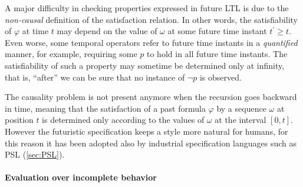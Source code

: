 A major difficulty in checking properties expressed in future LTL is due to the \textit{non-causal} definition of the satisfaction relation. In other words, the satisfiability of $\varphi$ at time $t$ may depend on the value of $\omega$ at some future time instant $t^\prime \geq t$. Even worse, some temporal operators refer to future time instants in a \textit{quantified} manner, for example, requiring some $p$ to hold in all future time instants. The satisfiability of such a property may sometime be determined only at infinity, that is, “after” we can be sure
that no instance of $\neg p$ is observed.
\par The causality problem is not present anymore when the recursion goes backward in time, meaning that the satisfaction of a past formula $\varphi$ by a sequence $\omega$ at position $t$ is determined only according to the values of $\omega$ at the interval $[0, t]$. However the futuristic specification keeps a style more natural for humans, for this reason it has been adopted also by industrial specification languages such as PSL (\ref{sec:PSL}).

\paragraph{Evaluation over incomplete behavior}

